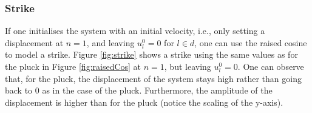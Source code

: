 \subsubsection{Strike}\label{sec:strike}
If one initialises the system with an initial velocity, i.e., only setting a displacement at $n=1$, and leaving $u^0_l = 0$ for $l\in d$, one can use the raised cosine to model a strike. Figure \ref{fig:strike} shows a strike using the same values as for the pluck in Figure \ref{fig:raisedCos} at $n=1$, but leaving $u_l^0 = 0$. One can observe that, for the pluck, the displacement of the system stays high rather than going back to 0 as in the case of the pluck. Furthermore, the amplitude of the displacement is higher than for the pluck (notice the scaling of the y-axis).%

